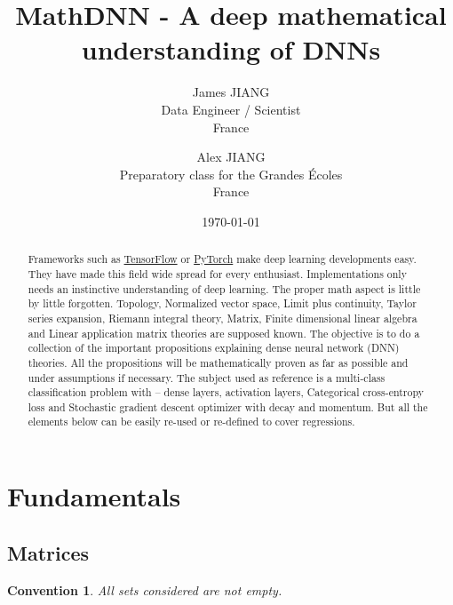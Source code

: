 \documentclass[11pt,en]{elegantpaper}
\title{MathDNN - A deep mathematical understanding of DNNs}
\author{James JIANG \\ Data Engineer / Scientist \\ France \and Alex JIANG \\ Preparatory class for the Grandes Écoles \\ France}
\institute{\href{https://github.com/iLoveDataJjia}{iLoveDataJjia Github}}
\date{\today}
\newtheorem{convention}{Convention}
\begin{document}
\maketitle

\begin{abstract}
  Frameworks such as \href{https://www.tensorflow.org/?hl=en}{TensorFlow} or \href{https://pytorch.org/}{PyTorch} make deep learning developments
  easy. They have made this field wide spread for every enthusiast. Implementations only needs an instinctive understanding of deep learning.
  The proper math aspect is little by little forgotten. Topology, Normalized vector space, Limit plus continuity, Taylor series expansion,
  Riemann integral theory, Matrix, Finite dimensional linear algebra and Linear application matrix theories are supposed known. The objective
  is to do a collection of the important propositions explaining dense neural network (DNN) theories. All the propositions will be
  mathematically proven as far as possible and under assumptions if necessary. The subject used as reference is a multi-class classification
  problem with – dense layers, activation layers, Categorical cross-entropy loss and Stochastic gradient descent optimizer with decay and momentum.
  But all the elements below can be easily re-used or re-defined to cover regressions.
\end{abstract}

\section{Fundamentals}

\subsection{Matrices}

\begin{convention}
  All sets considered are not empty.
\end{convention}
\end{document}
